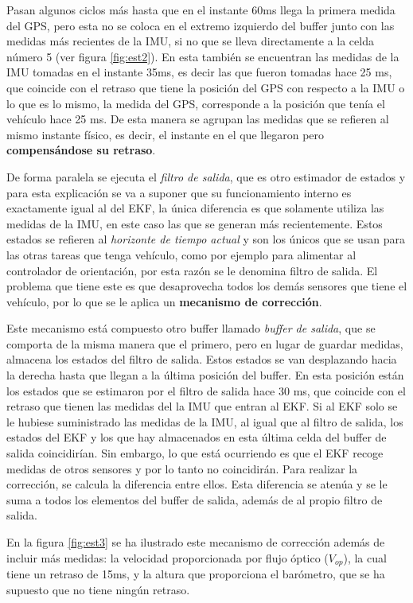 Pasan algunos ciclos más hasta que en el instante 60ms llega la primera medida del GPS, pero esta no se coloca en el extremo izquierdo del buffer junto con las medidas más recientes de la IMU, si no que se lleva directamente a la celda número 5 (ver figura \ref{fig:est2}). En esta también se encuentran las medidas de la IMU tomadas en el instante 35ms, es decir las que fueron tomadas hace 25 ms, que coincide con el retraso que tiene la posición del GPS con respecto a la IMU o lo que es lo mismo, la medida del GPS, corresponde a la posición que tenía el vehículo hace 25 ms. De esta manera se agrupan las medidas que se refieren al mismo instante físico, es decir, el instante en el que llegaron pero {\bfseries compensándose su retraso}. 


De forma paralela se ejecuta el \textit{filtro de salida}, que es otro estimador de estados y para esta explicación se va a suponer que su funcionamiento interno es exactamente igual al del EKF, la única diferencia es que solamente utiliza las medidas de la IMU, en este caso las que se generan más recientemente. Estos estados se refieren al \textit{horizonte de tiempo actual} y son los únicos que se usan para las otras tareas que tenga vehículo, como por ejemplo para alimentar al controlador de orientación, por esta razón se le denomina filtro de salida. El problema que tiene este es que desaprovecha todos los demás sensores que tiene el vehículo, por lo que se le aplica un \textbf{mecanismo de corrección}.  

Este mecanismo está compuesto otro buffer llamado \textit{buffer de salida}, que se comporta de la misma manera que el primero, pero en lugar de guardar medidas, almacena los estados del filtro de salida. Estos estados se van desplazando hacia la derecha hasta que llegan a la última posición del buffer. En esta posición están los estados que se estimaron por el filtro de salida hace 30 ms, que coincide con el retraso que tienen las medidas del la IMU que entran al EKF. Si al EKF solo se le hubiese suministrado las medidas de la IMU, al igual que al filtro de salida, los estados del EKF y los que hay almacenados en esta última celda del buffer de salida coincidirían. Sin embargo, lo que está ocurriendo es que el EKF recoge medidas de otros sensores y por lo tanto no coincidirán. Para realizar la corrección, se calcula la diferencia entre ellos. Esta diferencia se atenúa y se le suma a todos los elementos del buffer de salida, además de al propio filtro de salida. 

En la figura \ref{fig:est3} se ha ilustrado este mecanismo de corrección además de incluir más medidas: la velocidad proporcionada por flujo óptico ($V_{op}$), la cual tiene un retraso de 15ms, y la altura que proporciona el barómetro, que se ha supuesto que no tiene ningún retraso. 





